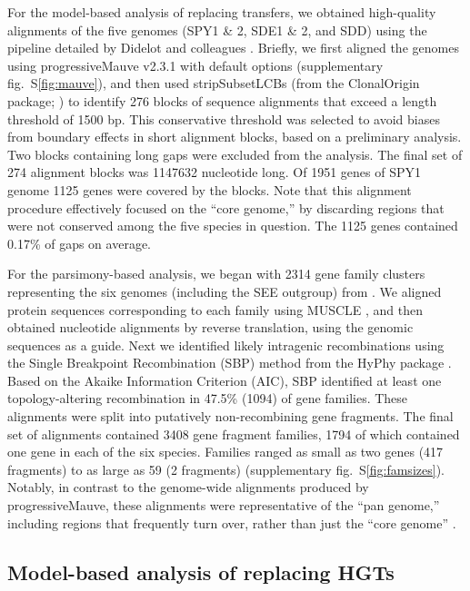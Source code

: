 \documentclass[12pt]{article}
\begin{document}
For the model-based analysis of replacing transfers, we obtained
high-quality alignments of the five genomes (SPY1 \& 2, SDE1 \& 2, and
SDD) using the 
pipeline detailed by Didelot and colleagues
\citep{Didelot2007,Didelot2010}.  Briefly, we first aligned the genomes
using progressiveMauve v2.3.1 \citep{Darling2004,Darling2010} with default
options (supplementary fig.\ S\ref{fig:mauve}), and then used stripSubsetLCBs (from the
ClonalOrigin package; \citealp{Didelot2010}) to identify 276 blocks of
sequence alignments that exceed a length threshold of 1500 bp.  This
conservative threshold was selected to avoid biases from boundary effects
in short alignment blocks, based on a preliminary analysis.  Two blocks
containing long gaps were excluded from the analysis.
The final set of 274
alignment blocks was 1147632 nucleotide long.
Of 1951 genes of SPY1 genome 1125 genes were covered by the blocks.
Note that this alignment
procedure effectively focused on the ``core genome,'' by discarding regions
that were not conserved among the five species in question.  The 1125 genes
contained 0.17\% of gaps on average.

For the parsimony-based analysis, we began with 2314 gene family
clusters representing the six genomes (including the SEE outgroup)
from \cite{Suzuki2011}.  We aligned protein sequences corresponding to
each family using MUSCLE \citep{Edgar2004a}, and then obtained
nucleotide alignments by reverse translation, using the genomic
sequences as a guide.  Next we identified likely intragenic
recombinations using the Single Breakpoint Recombination (SBP) method
from the HyPhy package \citep{KosakovskyPond2006}.  Based on the
Akaike Information Criterion (AIC), SBP identified at least one
topology-altering recombination in 47.5\% (1094) of gene
families. These alignments were split into putatively non-recombining
gene fragments.  The final set of alignments contained 3408 gene
fragment families, 1794 of which contained one gene in each of the six
species.  Families ranged as small as two genes (417 fragments) to as
large as 59 (2 fragments) (supplementary fig.\ S\ref{fig:famsizes}).  Notably, in
contrast to the genome-wide alignments produced by progressiveMauve,
these alignments were representative of the ``pan genome,'' including
regions that frequently turn over, rather than just the ``core
genome'' \citep[e.g.,][]{Tettelin2005,Lefebure2007}.

\subsection*{Model-based analysis of replacing HGTs}
\end{document}
